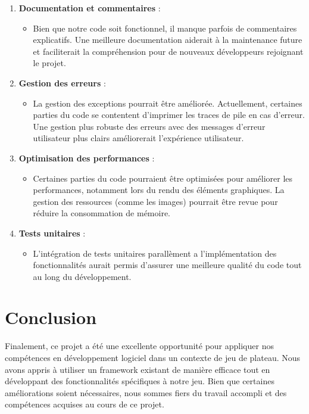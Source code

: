 \begin{enumerate}
	\item \textbf{Documentation et commentaires} :
	\begin{itemize}
		\item Bien que notre code soit fonctionnel, il manque parfois de commentaires explicatifs. Une meilleure documentation aiderait à la maintenance future et faciliterait la compréhension pour de nouveaux développeurs rejoignant le projet.
	\end{itemize}
	
	\item \textbf{Gestion des erreurs} :
	\begin{itemize}
		\item La gestion des exceptions pourrait être améliorée. Actuellement, certaines parties du code se contentent d'imprimer les traces de pile en cas d'erreur. Une gestion plus robuste des erreurs avec des messages d'erreur utilisateur plus clairs améliorerait l'expérience utilisateur.
	\end{itemize}
	
	\item \textbf{Optimisation des performances} :
	\begin{itemize}
		\item Certaines parties du code pourraient être optimisées pour améliorer les performances, notamment lors du rendu des éléments graphiques. La gestion des ressources (comme les images) pourrait être revue pour réduire la consommation de mémoire.
	\end{itemize}
	
	\item \textbf{Tests unitaires} :
	\begin{itemize}
		\item L'intégration de tests unitaires parallèment a l'implémentation des fonctionnalités aurait permis d'assurer une meilleure qualité du code tout au long du développement.
	\end{itemize}
\end{enumerate}


\section{Conclusion}

Finalement, ce projet a été une excellente opportunité pour appliquer nos compétences en développement logiciel dans un contexte de jeu de plateau. Nous avons appris à utiliser un framework existant de manière efficace tout en développant des fonctionnalités spécifiques à notre jeu. Bien que certaines améliorations soient nécessaires, nous sommes fiers du travail accompli et des compétences acquises au cours de ce projet.

